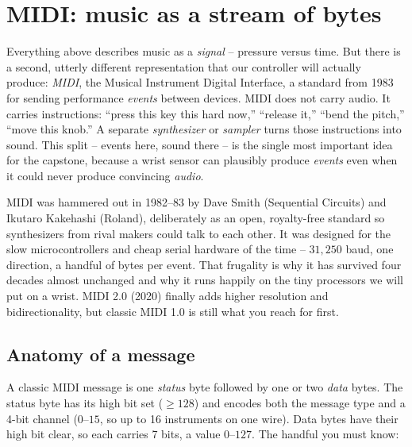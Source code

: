 \section{MIDI: music as a stream of bytes}
\label{ch29:midi}

Everything above describes music as a \emph{signal} -- pressure versus time. But there is a second,
utterly different representation that our controller will actually produce: \emph{MIDI}, the Musical
Instrument Digital Interface, a standard from 1983 for sending performance \emph{events} between
devices. MIDI does not carry audio. It carries instructions: ``press this key this hard now,''
``release it,'' ``bend the pitch,'' ``move this knob.'' A separate \emph{synthesizer} or
\emph{sampler} turns those instructions into sound. This split -- events here, sound there -- is the
single most important idea for the capstone, because a wrist sensor can plausibly produce
\emph{events} even when it could never produce convincing \emph{audio}.

\begin{historybox}
MIDI was hammered out in 1982--83 by Dave Smith (Sequential Circuits) and Ikutaro Kakehashi (Roland),
deliberately as an open, royalty-free standard so synthesizers from rival makers could talk to each
other. It was designed for the slow microcontrollers and cheap serial hardware of the time --
$31{,}250$ baud, one direction, a handful of bytes per event. That frugality is why it has survived
four decades almost unchanged and why it runs happily on the tiny processors we will put on a wrist.
MIDI 2.0 (2020) finally adds higher resolution and bidirectionality, but classic MIDI 1.0 is still
what you reach for first.
\end{historybox}

\subsection*{Anatomy of a message}

A classic MIDI message is one \emph{status} byte followed by one or two \emph{data} bytes. The status
byte has its high bit set ($\ge 128$) and encodes both the message type and a 4-bit channel ($0$--$15$,
so up to 16 instruments on one wire). Data bytes have their high bit clear, so each carries 7 bits, a
value $0$--$127$. The handful you must know:

